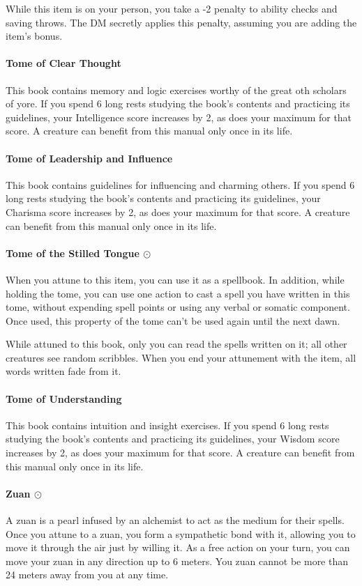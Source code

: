         While this item is on your person, you take a -2 penalty to ability checks and saving throws.
        The DM secretly applies this penalty, assuming you are adding the item's bonus.
    \paragraph{Tome of Clear Thought}
        This book contains memory and logic exercises worthy of the great oth scholars of yore.
        If you spend 6 long rests studying the book's contents and practicing its guidelines, your Intelligence score increases by 2, as does your maximum for that score.
        A creature can benefit from this manual only once in its life.
    \paragraph{Tome of Leadership and Influence}
        This book contains guidelines for influencing and charming others.
        If you spend 6 long rests studying the book's contents and practicing its guidelines, your Charisma score increases by 2, as does your maximum for that score.
        A creature can benefit from this manual only once in its life.
    \paragraph{Tome of the Stilled Tongue $\odot$}
        When you attune to this item, you can use it as a spellbook.
        In addition, while holding the tome, you can use one action to cast a spell you have written in this tome, without expending spell points or using any verbal or somatic component.
        Once used, this property of the tome can't be used again until the next dawn.

        While attuned to this book, only you can read the spells written on it; all other creatures see random scribbles.
        When you end your attunement with the item, all words written fade from it.
    \paragraph{Tome of Understanding}
        This book contains intuition and insight exercises.
        If you spend 6 long rests studying the book's contents and practicing its guidelines, your Wisdom score increases by 2, as does your maximum for that score.
        A creature can benefit from this manual only once in its life.
    \paragraph{Zuan $\odot$} \label{item::zuan}
        A zuan is a pearl infused by an alchemist to act as the medium for their spells.
        Once you attune to a zuan, you form a sympathetic bond with it, allowing you to move it through the air just by willing it.
        As a free action on your turn, you can move your zuan in any direction up to 6 meters.
        You zuan cannot be more than 24 meters away from you at any time.
